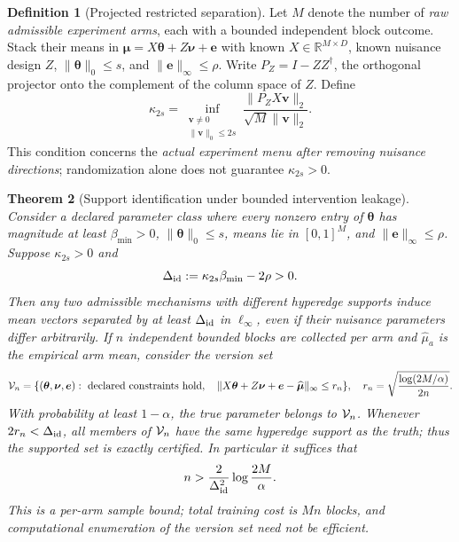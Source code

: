\documentclass[11pt,a4paper]{article}
\newcommand{\R}{\mathbb{R}}\newcommand{\N}{\mathbb{N}}
\newtheorem{theorem}{Theorem}[section]
\theoremstyle{definition}\newtheorem{definition}[theorem]{Definition}
\theoremstyle{remark}\newtheorem{remark}[theorem]{Remark}
\begin{document}
\begin{definition}[Projected restricted separation]\label{def:re}
Let $M$ denote the number of \emph{raw admissible experiment arms}, each with a bounded independent block outcome. Stack their means in $\bm\mu=X\bm\theta+Z\bm\nu+\bm e$ with known $X\in\R^{M\times D}$, known nuisance design $Z$, $\|\bm\theta\|_0\le s$, and $\|\bm e\|_\infty\le\rho$. Write $P_Z=I-ZZ^\dagger$, the orthogonal projector onto the complement of the column space of $Z$. Define
\begin{equation}\label{eq:kappa}
 \kappa_{2s}=\inf_{\substack{\bm v\ne0\\\|\bm v\|_0\le2s}}
 \frac{\|P_Z X\bm v\|_2}{\sqrt M\|\bm v\|_2}.
\end{equation}
This condition concerns the \emph{actual experiment menu after removing nuisance directions}; randomization alone does not guarantee $\kappa_{2s}>0$.
\end{definition}
\begin{theorem}[Support identification under bounded intervention leakage]\label{thm:sparse}
Consider a declared parameter class where every nonzero entry of $\bm\theta$ has magnitude at least $\beta_{\min}>0$, $\|\bm\theta\|_0\le s$, means lie in $[0,1]^M$, and $\|\bm e\|_\infty\le\rho$. Suppose $\kappa_{2s}>0$ and
\begin{equation}\label{eq:delta}
 \Delta_{\rm id}:=\kappa_{2s}\beta_{\min}-2\rho>0.
\end{equation}
Then any two admissible mechanisms with \emph{different} hyperedge supports induce mean vectors separated by at least $\Delta_{\rm id}$ in $\ell_\infty$, even if their nuisance parameters differ arbitrarily. If $n$ independent bounded blocks are collected \emph{per arm} and $\widehat\mu_a$ is the empirical arm mean, consider the version set
\[
 \mathcal{V}_n=\{(\bm\theta,\bm\nu,\bm e):\ \text{declared constraints hold},\quad
 \|X\bm\theta+Z\bm\nu+\bm e-\widehat{\bm\mu}\|_\infty\le r_n\},
\quad r_n=\sqrt{\frac{\log(2M/\alpha)}{2n}}.
\]
With probability at least $1-\alpha$, the true parameter belongs to $\mathcal{V}_n$. Whenever $2r_n<\Delta_{\rm id}$, \emph{all} members of $\mathcal{V}_n$ have the same hyperedge support as the truth; thus the supported set is exactly certified. In particular it suffices that
\begin{equation}\label{eq:samplebound}
 n>\frac{2}{\Delta_{\rm id}^{2}}\log\frac{2M}{\alpha}.
\end{equation}
This is a \emph{per-arm} sample bound; total training cost is $Mn$ blocks, and computational enumeration of the version set need not be efficient.
\end{theorem}
\end{document}
